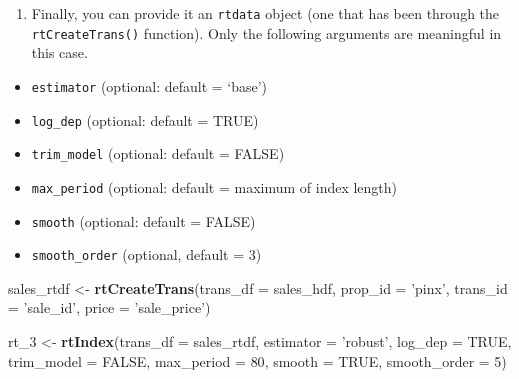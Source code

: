 \documentclass[]{article}
\newenvironment{Shaded}{\begin{snugshade}}{\end{snugshade}}
\newcommand{\KeywordTok}[1]{\textcolor[rgb]{0.13,0.29,0.53}{\textbf{#1}}}
\newcommand{\DataTypeTok}[1]{\textcolor[rgb]{0.13,0.29,0.53}{#1}}
\newcommand{\DecValTok}[1]{\textcolor[rgb]{0.00,0.00,0.81}{#1}}
\newcommand{\StringTok}[1]{\textcolor[rgb]{0.31,0.60,0.02}{#1}}
\newcommand{\OtherTok}[1]{\textcolor[rgb]{0.56,0.35,0.01}{#1}}
\newcommand{\NormalTok}[1]{#1}
\providecommand{\tightlist}{%
  \setlength{\itemsep}{0pt}\setlength{\parskip}{0pt}}
\begin{document}
\begin{enumerate}
\def\labelenumi{\arabic{enumi}.}
\setcounter{enumi}{2}
\tightlist
\item
  Finally, you can provide it an \texttt{rtdata} object (one that has
  been through the \texttt{rtCreateTrans()} function). Only the
  following arguments are meaningful in this case.
\end{enumerate}

\begin{itemize}
\tightlist
\item
  \texttt{estimator} (optional: default = `base')
\item
  \texttt{log\_dep} (optional: default = TRUE)
\item
  \texttt{trim\_model} (optional: default = FALSE)
\item
  \texttt{max\_period} (optional: default = maximum of index length)
\item
  \texttt{smooth} (optional: default = FALSE)
\item
  \texttt{smooth\_order} (optional, default = 3)
\end{itemize}

\begin{Shaded}
\begin{Highlighting}[]
\NormalTok{  sales_rtdf <-}\StringTok{ }\KeywordTok{rtCreateTrans}\NormalTok{(}\DataTypeTok{trans_df =}\NormalTok{ sales_hdf,}
                            \DataTypeTok{prop_id =} \StringTok{'pinx'}\NormalTok{,}
                            \DataTypeTok{trans_id =} \StringTok{'sale_id'}\NormalTok{,}
                            \DataTypeTok{price =} \StringTok{'sale_price'}\NormalTok{)}
\end{Highlighting}
\end{Shaded}

\begin{Shaded}
\begin{Highlighting}[]
\NormalTok{  rt_}\DecValTok{3}\NormalTok{ <-}\StringTok{ }\KeywordTok{rtIndex}\NormalTok{(}\DataTypeTok{trans_df =}\NormalTok{ sales_rtdf,}
                  \DataTypeTok{estimator =} \StringTok{'robust'}\NormalTok{,}
                  \DataTypeTok{log_dep =} \OtherTok{TRUE}\NormalTok{,}
                  \DataTypeTok{trim_model =} \OtherTok{FALSE}\NormalTok{,}
                  \DataTypeTok{max_period =} \DecValTok{80}\NormalTok{,}
                  \DataTypeTok{smooth =} \OtherTok{TRUE}\NormalTok{,}
                  \DataTypeTok{smooth_order =} \DecValTok{5}\NormalTok{)}
\end{Highlighting}
\end{Shaded}
\end{document}
